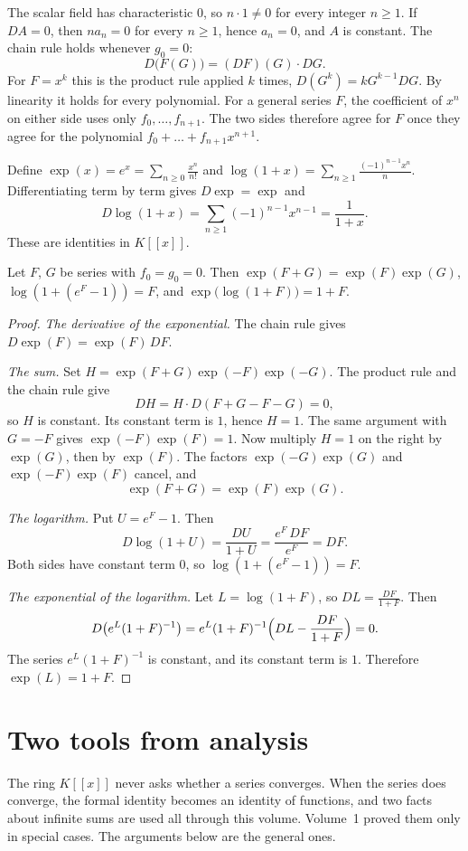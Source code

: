 The scalar field has characteristic $0$, so $n\cdot1\ne0$ for every integer $n\ge1$. If $DA=0$, then $na_n=0$ for every $n\ge1$, hence $a_n=0$, and $A$ is constant. The chain rule holds whenever $g_0=0$:
\[
D\bigl(F(G)\bigr)=(DF)(G)\cdot DG.
\]
For $F=x^k$ this is the product rule applied $k$ times, $D(G^k)=kG^{k-1}DG$. By linearity it holds for every polynomial. For a general series $F$, the coefficient of $x^n$ on either side uses only $f_0,\dots,f_{n+1}$. The two sides therefore agree for $F$ once they agree for the polynomial $f_0+\dots+f_{n+1}x^{n+1}$.

Define $\exp(x)=e^x=\sum_{n\ge0}\frac{x^n}{n!}$ and $\log(1+x)=\sum_{n\ge1}\frac{(-1)^{n-1}x^n}n$. Differentiating term by term gives $D\exp=\exp$ and
\[
D\log(1+x)=\sum_{n\ge1}(-1)^{n-1}x^{n-1}=\frac1{1+x}.
\]
These are identities in $K[[x]]$.

\begin{proposition}\label{prop:explog}
Let $F$, $G$ be series with $f_0=g_0=0$. Then $\exp(F+G)=\exp(F)\exp(G)$, $\log(1+(e^F-1))=F$, and
$\exp\bigl(\log(1+F)\bigr)=1+F$.
\end{proposition}
\begin{proof}
\emph{The derivative of the exponential.}
The chain rule gives $D\exp(F)=\exp(F)\,DF$.

\emph{The sum.}
Set $H=\exp(F+G)\exp(-F)\exp(-G)$. The product rule and the chain rule give
\[
DH=H\cdot D(F+G-F-G)=0,
\]
so $H$ is constant. Its constant term is $1$, hence $H=1$. The same argument with $G=-F$ gives $\exp(-F)\exp(F)=1$. Now multiply $H=1$ on the right by $\exp(G)$, then by $\exp(F)$. The factors $\exp(-G)\exp(G)$ and $\exp(-F)\exp(F)$ cancel, and
\[
\exp(F+G)=\exp(F)\exp(G).
\]

\emph{The logarithm.}
Put $U=e^F-1$. Then
\[
D\log(1+U)=\frac{DU}{1+U}=\frac{e^F\,DF}{e^F}=DF.
\]
Both sides have constant term $0$, so $\log(1+(e^F-1))=F$.

\emph{The exponential of the logarithm.}
Let $L=\log(1+F)$, so $DL=\frac{DF}{1+F}$. Then
\[
D\bigl(e^L(1+F)^{-1}\bigr)=e^L(1+F)^{-1}\Bigl(DL-\frac{DF}{1+F}\Bigr)=0.
\]
The series $e^L(1+F)^{-1}$ is constant, and its constant term is $1$. Therefore $\exp(L)=1+F$.
\end{proof}

\section{Two tools from analysis}

The ring $K[[x]]$ never asks whether a series converges. When the series does converge, the formal identity becomes an identity of functions, and two facts about infinite sums are used all through this volume. Volume~1 proved them only in special cases. The arguments below are the general ones.

